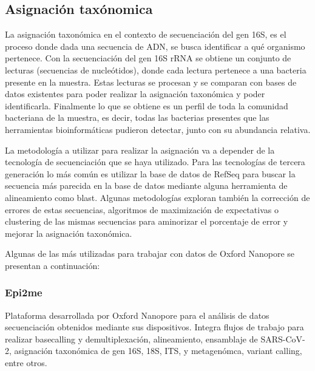 \subsection{Asignación taxónomica}
La asignación taxonómica en el contexto de secuenciación del gen 16S, es el proceso donde dada una secuencia de ADN, se busca identificar a qué organismo pertenece.
Con la secuenciación del gen 16S rRNA se obtiene un conjunto de lecturas (secuencias de nucleótidos), donde cada lectura pertenece a una bacteria presente en la muestra. 
Estas lecturas se procesan y se comparan con bases de datos existentes para poder realizar la asignación taxonómica y poder identificarla. 
Finalmente lo que se obtiene es un perfil de toda la comunidad bacteriana de la muestra, es decir, todas las bacterias presentes que las herramientas bioinformáticas pudieron detectar, junto con su abundancia relativa.


La metodología a utilizar para realizar la asignación va a depender de la tecnología de secuenciación que se haya utilizado.%
Para las tecnologías de tercera generación lo más común es utilizar la base de datos de RefSeq para buscar la secuencia más parecida en la base de datos mediante alguna herramienta de alineamiento como blast.
Algunas metodologías exploran también la corrección de errores de estas secuencias, algoritmos de maximización de expectativas o clustering de las mismas secuencias para aminorizar el porcentaje de error y mejorar la asignación taxonómica. 

Algunas de las más utilizadas para trabajar con datos de Oxford Nanopore se presentan a continuación:

\subsubsection{Epi2me}
Plataforma desarrollada por Oxford Nanopore para el análisis de datos secuenciación obtenidos mediante sus dispositivos. 
Integra flujos de trabajo para realizar basecalling y demultiplexación, alineamiento, ensamblaje de SARS-CoV-2, asignación taxonómica de gen 16S, 18S, ITS, y metagenómca, variant calling, entre otros.

